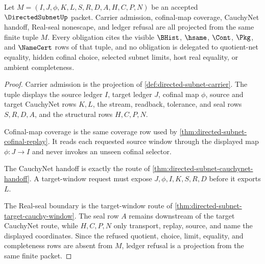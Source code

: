 \begin{theorem}
\label{thm:directed-subnet-obligation-route}
Let $M=(I,J,\phi,K,L,S,R,D,A,H,C,P,N)$ be an accepted $\DirectedSubnetUp$ packet. Carrier admission, cofinal-map coverage, CauchyNet handoff, Real-seal nonescape, and ledger refusal are all projected from the same finite tuple $M$. Every obligation cites the visible $\BHist$, $\hsame$, $\Cont$, $\Pkg$, and $\NameCert$ rows of that tuple, and no obligation is delegated to quotient-net equality, hidden cofinal choice, selected subnet limits, host real equality, or ambient completeness.
\end{theorem}
\begin{proof}
Carrier admission is the projection of \autoref{def:directed-subnet-carrier}. The tuple displays the source ledger $I$, target ledger $J$, cofinal map $\phi$, source and target CauchyNet rows $K,L$, the stream, readback, tolerance, and seal rows $S,R,D,A$, and the structural rows $H,C,P,N$.

Cofinal-map coverage is the same coverage row used by \autoref{thm:directed-subnet-cofinal-replay}. It reads each requested source window through the displayed map $\phi:J\to I$ and never invokes an unseen cofinal selector.

The CauchyNet handoff is exactly the route of \autoref{thm:directed-subnet-cauchynet-handoff}. A target-window request must expose $J,\phi,I,K,S,R,D$ before it exports $L$.

The Real-seal boundary is the target-window route of \autoref{thm:directed-subnet-target-cauchy-window}. The seal row $A$ remains downstream of the target CauchyNet route, while $H,C,P,N$ only transport, replay, source, and name the displayed coordinates. Since the refused quotient, choice, limit, equality, and completeness rows are absent from $M$, ledger refusal is a projection from the same finite packet.
\end{proof}

